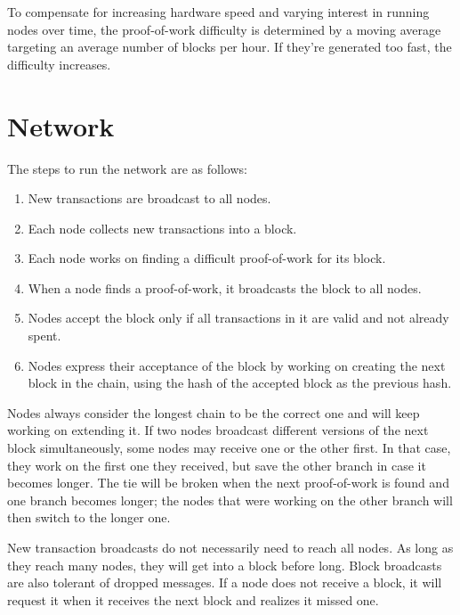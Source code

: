 \documentclass[nohyper]{tufte-handout}
\begin{document}
To compensate for increasing hardware speed and varying interest in running nodes over time, the proof-of-work difficulty is determined by a moving average targeting an average number of blocks per hour. If they're generated too fast, the difficulty increases.  

\section{Network}\label{network}

The steps to run the network are as follows:

\begin{enumerate}[1)]
\item
  New transactions are broadcast to all nodes.
\item
  Each node collects new transactions into a block.
\item
  Each node works on finding a difficult proof-of-work for its block.
\item
  When a node finds a proof-of-work, it broadcasts the block to all
  nodes.
\item
  Nodes accept the block only if all transactions in it are valid and
  not already spent.
\item
  Nodes express their acceptance of the block by working on creating the
  next block in the chain, using the hash of the accepted block as the
  previous hash.
\end{enumerate}

Nodes always consider the longest chain to be the correct one and will keep working on extending it. If two nodes broadcast different versions of the next block simultaneously, some nodes may receive one or the other first. In that case, they work on the first one they received, but save the other branch in case it becomes longer. The tie will be broken when the next proof-of-work is found and one branch becomes longer; the
nodes that were working on the other branch will then switch to the longer one.

New transaction broadcasts do not necessarily need to reach all nodes.
As long as they reach many nodes, they will get into a block before long. Block broadcasts are also tolerant of dropped messages. If a node does not receive a block, it will request it when it receives the next block and realizes it missed one.
\end{document}
